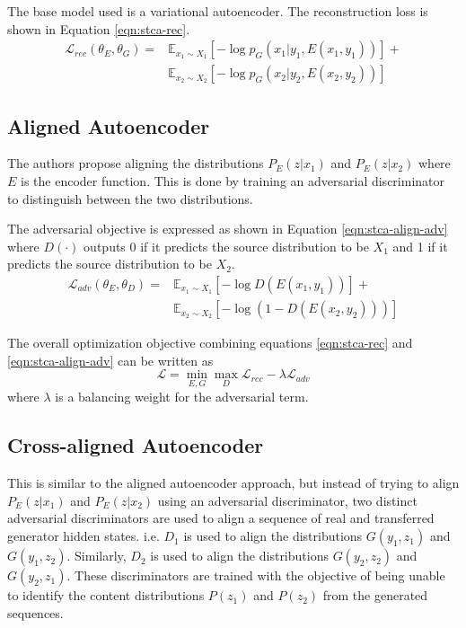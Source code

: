 The base model used is a variational autoencoder. The reconstruction loss is shown in Equation \ref{eqn:stca-rec}.
\begin{align} \label{eqn:stca-rec}
	\mathcal{L}_{rec}(\theta_E,\theta_G) =
	 & \mathbb{E}_{x_1 \sim X_1}[-\log p_G(x_1|y_1,E(x_1, y_1))] + \nonumber \\
	 & \mathbb{E}_{x_2 \sim X_2}[-\log p_G(x_2|y_2,E(x_2, y_2))]
\end{align}

\subsection{Aligned Autoencoder}

The authors propose aligning the distributions $P_E(z|x_1)$ and $P_E(z|x_2)$ where $E$ is the encoder function. This is done by training an adversarial discriminator to distinguish between the two distributions.

The adversarial objective is expressed as shown in Equation \ref{eqn:stca-align-adv} where $D(\cdot)$ outputs 0 if it predicts the source distribution to be $X_1$ and 1 if it predicts the source distribution to be $X_2$.
\begin{align} \label{eqn:stca-align-adv}
	\mathcal{L}_{adv}(\theta_E,\theta_D) =
	 & \mathbb{E}_{x_1 \sim X_1}[-\log D(E(x_1,y_1))] + \nonumber \\
	 & \mathbb{E}_{x_2 \sim X_2}[-\log(1 - D(E(x_2,y_2)))]
\end{align}

The overall optimization objective combining equations \ref{eqn:stca-rec} and \ref{eqn:stca-align-adv} can be written as
\begin{equation}
	\mathcal{L} = \operatorname*{min}_{E,G} \operatorname*{max}_{D} \mathcal{L}_{rec} - \lambda \mathcal{L}_{adv}
\end{equation}
where $\lambda$ is a balancing weight for the adversarial term.

\subsection{Cross-aligned Autoencoder}

This is similar to the aligned autoencoder approach, but instead of trying to align $P_E(z|x_1)$ and $P_E(z|x_2)$ using an adversarial discriminator, two distinct adversarial discriminators are used to align a sequence of real and transferred generator hidden states. i.e. $D_1$ is used to align the distributions $G(y_1, z_1)$ and $G(y_1, z_2)$. Similarly, $D_2$ is used to align the distributions $G(y_2, z_2)$ and $G(y_2, z_1)$. These discriminators are trained with the objective of being unable to identify the content distributions $P(z_1)$ and $P(z_2)$ from the generated sequences.

